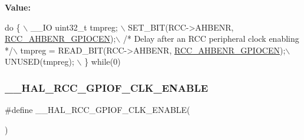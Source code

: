 {\bfseries Value\+:}
\begin{DoxyCode}
\textcolor{keywordflow}{do} \{ \(\backslash\)
                                        \_\_IO uint32\_t tmpreg; \(\backslash\)
                                        SET\_BIT(RCC->AHBENR, \hyperlink{group___peripheral___registers___bits___definition_ga7e5c4504b7adbb13372e7536123a756b}{RCC\_AHBENR\_GPIOCEN});\(\backslash\)
                                        \textcolor{comment}{/* Delay after an RCC peripheral clock enabling */}\(\backslash\)
                                        tmpreg = READ\_BIT(RCC->AHBENR, 
      \hyperlink{group___peripheral___registers___bits___definition_ga7e5c4504b7adbb13372e7536123a756b}{RCC\_AHBENR\_GPIOCEN});\(\backslash\)
                                        UNUSED(tmpreg); \(\backslash\)
                                      \} \textcolor{keywordflow}{while}(0)
\end{DoxyCode}
\mbox{\label{group___r_c_c___a_h_b___clock___enable___disable_ga84098c3c8735d401024a1fb762e9527f}} 
\subsubsection{\texorpdfstring{\+\_\+\+\_\+\+H\+A\+L\+\_\+\+R\+C\+C\+\_\+\+G\+P\+I\+O\+F\+\_\+\+C\+L\+K\+\_\+\+E\+N\+A\+B\+LE}{\_\_HAL\_RCC\_GPIOF\_CLK\_ENABLE}}
{\footnotesize\ttfamily \#define \+\_\+\+\_\+\+H\+A\+L\+\_\+\+R\+C\+C\+\_\+\+G\+P\+I\+O\+F\+\_\+\+C\+L\+K\+\_\+\+E\+N\+A\+B\+LE(\begin{DoxyParamCaption}{ }\end{DoxyParamCaption})}

